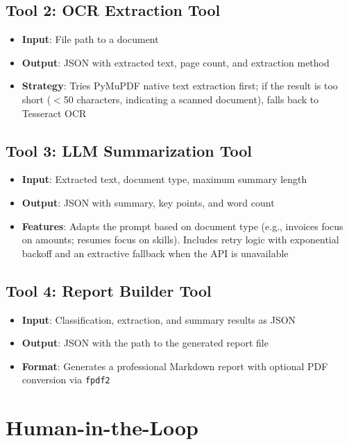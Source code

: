 \documentclass[12pt,a4paper]{article}
\begin{document}
\subsection{Tool 2: OCR Extraction Tool}
\begin{itemize}
    \item \textbf{Input}: File path to a document
    \item \textbf{Output}: JSON with extracted text, page count, and extraction method
    \item \textbf{Strategy}: Tries PyMuPDF native text extraction first; if the result is too short ($<$50 characters, indicating a scanned document), falls back to Tesseract OCR
\end{itemize}

\subsection{Tool 3: LLM Summarization Tool}
\begin{itemize}
    \item \textbf{Input}: Extracted text, document type, maximum summary length
    \item \textbf{Output}: JSON with summary, key points, and word count
    \item \textbf{Features}: Adapts the prompt based on document type (e.g., invoices focus on amounts; resumes focus on skills). Includes retry logic with exponential backoff and an extractive fallback when the API is unavailable
\end{itemize}

\subsection{Tool 4: Report Builder Tool}
\begin{itemize}
    \item \textbf{Input}: Classification, extraction, and summary results as JSON
    \item \textbf{Output}: JSON with the path to the generated report file
    \item \textbf{Format}: Generates a professional Markdown report with optional PDF conversion via \texttt{fpdf2}
\end{itemize}

\section{Human-in-the-Loop}
\end{document}
